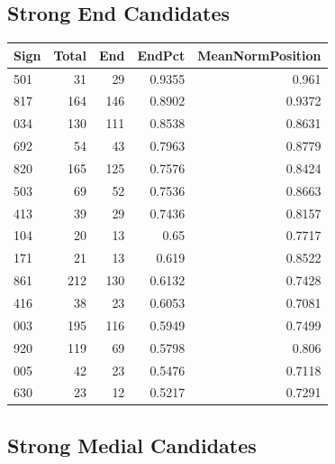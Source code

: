 ﻿\documentclass[11pt,a4paper]{article}
\begin{document}
\subsection*{Strong End Candidates}

\begin{center}
\begin{tabular}{lrrrr}
\toprule
\textbf{Sign} & \textbf{Total} & \textbf{End} & \textbf{EndPct} & \textbf{MeanNormPosition} \\
\midrule
501 & 31 & 29 & 0.9355 & 0.961 \\
817 & 164 & 146 & 0.8902 & 0.9372 \\
034 & 130 & 111 & 0.8538 & 0.8631 \\
692 & 54 & 43 & 0.7963 & 0.8779 \\
820 & 165 & 125 & 0.7576 & 0.8424 \\
503 & 69 & 52 & 0.7536 & 0.8663 \\
413 & 39 & 29 & 0.7436 & 0.8157 \\
104 & 20 & 13 & 0.65 & 0.7717 \\
171 & 21 & 13 & 0.619 & 0.8522 \\
861 & 212 & 130 & 0.6132 & 0.7428 \\
416 & 38 & 23 & 0.6053 & 0.7081 \\
003 & 195 & 116 & 0.5949 & 0.7499 \\
920 & 119 & 69 & 0.5798 & 0.806 \\
005 & 42 & 23 & 0.5476 & 0.7118 \\
630 & 23 & 12 & 0.5217 & 0.7291 \\
\bottomrule
\end{tabular}
\end{center}

\subsection*{Strong Medial Candidates}
\end{document}
